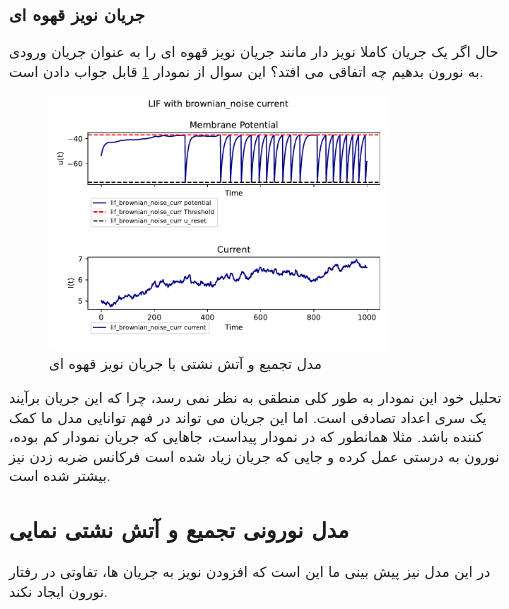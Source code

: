 \documentclass{article}
\begin{document}
            \subsubsection{جریان نویز قهوه ای}
                حال اگر یک جریان کاملا نویز دار مانند جریان نویز قهوه ای را به عنوان جریان ورودی به نورون بدهیم چه اتفاقی می افتد؟ این سوال از نمودار 
                \ref{fig:lif-brownian-noise-curr}
                قابل جواب دادن است.
                \begin{figure}[H]
                    \centering
                    \includegraphics[width=0.8\textwidth]{plots/LIF with brownian_noise current.pdf} 
                    \caption{مدل تجمیع و آتش نشتی با جریان نویز قهوه ای}
                    \label{fig:lif-brownian-noise-curr}
                \end{figure}
                تحلیل خود این نمودار به طور کلی منطقی به نظر نمی رسد، چرا که این جریان برآیند یک سری اعداد تصادفی است. اما این جریان می تواند در فهم توانایی مدل ما کمک کننده باشد. مثلا همانطور که در نمودار پیداست، جاهایی که جریان نمودار کم بوده، نورون به درستی عمل کرده و جایی که جریان زیاد شده است فرکانس ضربه زدن نیز بیشتر شده است.

        \subsection{مدل نورونی تجمیع و آتش نشتی نمایی}
            در این مدل نیز پیش بینی ما این است که افزودن نویز به جریان ها، تفاوتی در رفتار نورون ایجاد نکند.
\end{document}
